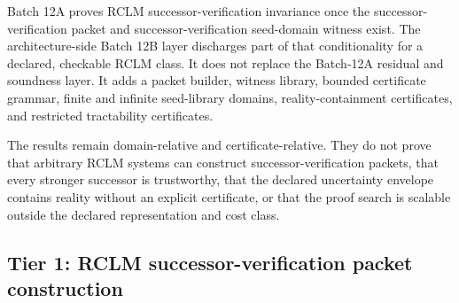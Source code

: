 \documentclass[11pt,a4paper]{article}
\begin{document}
Batch 12A proves RCLM successor-verification invariance once the successor-verification packet and successor-verification seed-domain witness exist.  The architecture-side Batch 12B layer discharges part of that conditionality for a declared, checkable RCLM class.  It does not replace the Batch-12A residual and soundness layer.  It adds a packet builder, witness library, bounded certificate grammar, finite and infinite seed-library domains, reality-containment certificates, and restricted tractability certificates.

\begin{center}
\end{center}

The results remain domain-relative and certificate-relative. They do not prove that arbitrary RCLM systems can construct successor-verification packets, that every stronger successor is trustworthy, that the declared uncertainty envelope contains reality without an explicit certificate, or that the proof search is scalable outside the declared representation and cost class.

\subsection{Tier 1: RCLM successor-verification packet construction}
\end{document}
